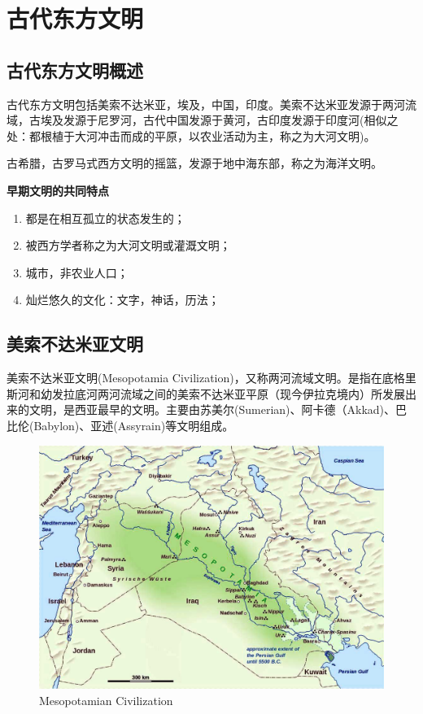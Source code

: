 \section{古代东方文明}

\subsection{古代东方文明概述}
古代东方文明包括美索不达米亚，埃及，中国，印度。美索不达米亚发源于两河流域，古埃及发源于尼罗河，古代中国发源于黄河，古印度发源于印度河(相似之处：都根植于大河冲击而成的平原，以农业活动为主，称之为大河文明)。

古希腊，古罗马式西方文明的摇篮，发源于地中海东部，称之为海洋文明。

\textbf{早期文明的共同特点}
\begin{enumerate}
    \item 都是在相互孤立的状态发生的；
    \item 被西方学者称之为大河文明或灌溉文明；
    \item 城市，非农业人口；
    \item 灿烂悠久的文化：文字，神话，历法；
\end{enumerate}

\subsection{美索不达米亚文明}
美索不达米亚文明(Mesopotamia Civilization)，又称两河流域文明。是指在底格里斯河和幼发拉底河两河流域之间的美索不达米亚平原（现今伊拉克境内）所发展出来的文明，是西亚最早的文明。主要由苏美尔(Sumerian)、阿卡德（Akkad)、巴比伦(Babylon)、亚述(Assyrain)等文明组成。

\begin{figure}[thbp!]
\centering
\includegraphics[width=0.8\linewidth]{figure/Map-Mesopotamian-Civilization.jpg}
\caption{Mesopotamian Civilization}
\label{fig:backphoto}
\end{figure}

